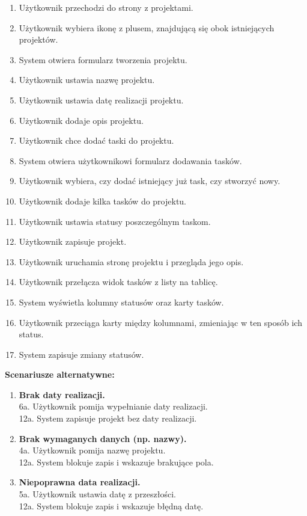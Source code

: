 \documentclass[12pt,a4paper,twoside]{report}
\begin{document}
\begin{enumerate}
\def\labelenumi{\arabic{enumi}.}
\item
  Użytkownik przechodzi do strony z projektami.
\item
  Użytkownik wybiera ikonę z plusem, znajdującą się obok istniejących projektów.
\item
  System otwiera formularz tworzenia projektu.
\item
  Użytkownik ustawia nazwę projektu.
\item
  Użytkownik ustawia datę realizacji projektu.
\item
  Użytkownik dodaje opis projektu.
\item
  Użytkownik chce dodać taski do projektu.
\item
  System otwiera użytkownikowi formularz dodawania tasków.
\item
  Użytkownik wybiera, czy dodać istniejący już task, czy stworzyć nowy.
\item
  Użytkownik dodaje kilka tasków do projektu.
\item
  Użytkownik ustawia statusy poszczególnym taskom.
\item
  Użytkownik zapisuje projekt.
\item
  Użytkownik uruchamia stronę projektu i przegląda jego opis.
\item
  Użytkownik przełącza widok tasków z listy na tablicę.
\item
  System wyświetla kolumny statusów oraz karty tasków.
\item
  Użytkownik przeciąga karty między kolumnami, zmieniając w ten sposób ich status.
\item
  System zapisuje zmiany statusów.
\end{enumerate}

\noindent \textbf{Scenariusze alternatywne:}

\begin{enumerate}
\def\labelenumi{\arabic{enumi}.}
\item
  \textbf{Brak daty realizacji.}\\
  6a. Użytkownik pomija wypełnianie daty realizacji.\\
  12a. System zapisuje projekt bez daty realizacji.
\item
  \textbf{Brak wymaganych danych (np. nazwy).}\\
  4a. Użytkownik pomija nazwę projektu.\\
  12a. System blokuje zapis i wskazuje brakujące pola.
\item
  \textbf{Niepoprawna data realizacji.}\\
  5a. Użytkownik ustawia datę z przeszłości.\\
  12a. System blokuje zapis i wskazuje błędną datę.
\end{enumerate}
\end{document}
